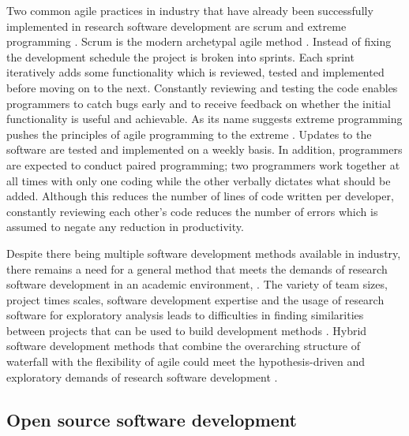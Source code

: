 \documentclass[../main.tex]{subfiles}
\begin{document}
Two common agile practices in industry that have already been successfully implemented in research software development are scrum and extreme programming \parencite{Sletholt2011,Sadath2018}.
Scrum is the modern archetypal agile method \parencite{Schwaber2020}.
Instead of fixing the development schedule the project is broken into sprints.
Each sprint iteratively adds some functionality which is reviewed, tested and implemented before moving on to the next.
Constantly reviewing and testing the code enables programmers to catch bugs early and to receive feedback on whether the initial functionality is useful and achievable.
As its name suggests extreme programming pushes the principles of agile programming to the extreme \parencite{Beck2004}.
Updates to the software are tested and implemented on a weekly basis. 
In addition, programmers are expected to conduct paired programming; 
two programmers work together at all times with only one coding while the other verbally dictates what should be added. 
Although this reduces the number of lines of code written per developer, constantly reviewing each other's code reduces the number of errors which is assumed to negate any reduction in productivity.

Despite there being multiple software development methods available in industry, there remains a need for a general method that meets the demands of research software development in an academic environment, \parencite{Cereci2018}. 
The variety of team sizes, project times scales, software development expertise and the usage of research software for exploratory analysis leads to difficulties in finding similarities between projects that can be used to build development methods \parencite{Hannay2009, Diaz2019}.
Hybrid software development methods that combine the overarching structure of waterfall with the flexibility of agile could meet the hypothesis-driven and exploratory demands of research software development \parencite{Pathak2012}.

\subsection{Open source software development}
\end{document}
